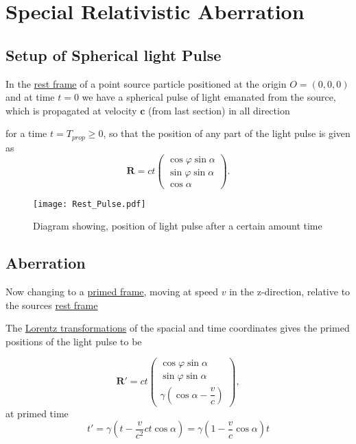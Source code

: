 \section{Special Relativistic Aberration}
\subsection{Setup of Spherical light Pulse}

In the \hyperlink{def-proper-frame}{rest frame} of a point source particle positioned at the origin $O = (0,0,0)$ and at time $t=0$ we have a spherical pulse of light emanated from the source, which is propagated at velocity $\mathbf{c}$ (from last section) in all direction 

for a time $t=T_{prop} \geq 0$, so that the position of any part of the light pulse is given as 
\begin{equation}%
\label{displacement: proper pulse}
    \mathbf{R} =  c t \begin{pmatrix}
    \cos{\varphi}\sin{\alpha}\\ \sin{\varphi}\sin{\alpha} \\ \cos{\alpha}
    \end{pmatrix}.
\end{equation}%

\begin{figure}[ht]
\centering
       \texttt{[image: Rest\_Pulse.pdf]}
    \caption{Diagram showing, position of light pulse after a certain amount time}
    \label{fig: Rest Pulse}
\end{figure}

\subsection{Aberration}

Now changing to a \hyperlink{def-Primed-Frame}{primed frame}, moving at speed $v$ in the z-direction, relative to the sources \hyperlink{def-proper-frame}{rest frame}

The \hyperlink{def-lorentz-transform}{Lorentz transformations} of the spacial and time coordinates gives the primed positions of the light pulse to be

\begin{equation}%
\label{displacement: primed pulse}
    \mathbf{R'} = c t \begin{pmatrix}
    \cos{\varphi}\sin{\alpha}\\ \sin{\varphi}\sin{\alpha} \\ \gamma\left(\cos{\alpha} - \dfrac{v}{c}\right)
    \end{pmatrix},
\end{equation}%
at primed time 
\begin{equation}%
    t' = \gamma \left(t - \dfrac{v}{c^2}ct\cos{\alpha}\right) =  \gamma \left(1 - \frac{v}{c} \cos{\alpha}\right) t 
\end{equation}%

